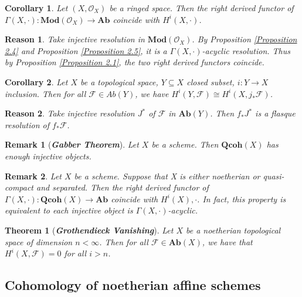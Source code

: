 \documentclass{ctexart}
\newtheorem{remark}{Remark}[section]
\newtheorem{theorem}{Theorem}[section]
\newtheorem{reason}{Reason}[section]
\newtheorem{corollary}{Corollary}[section]
\newcommand{\abeliangroups}{\mathbf{Ab}}
\newcommand{\module}{\mathbf{Mod}}
\newcommand{\quasicoherent}{\mathbf{Qcoh}}
\begin{document}
\begin{corollary}
    Let $(X, \mathcal{O}_{X})$ be a ringed space.
    Then the right derived functor of $\Gamma(X, \cdot): \module (\mathcal{O}_{X}) \longrightarrow \abeliangroups$ coincide with $H^{i}(X, \cdot)$.
    \label{Corollary 2.2}
\end{corollary}
\begin{reason}
    Take injective resolution in $\module (\mathcal{O}_{X})$.
    By Proposition \ref{Proposition 2.4} and Proposition \ref{Proposition 2.5}, it is a $\Gamma(X, \cdot)$-acyclic resolution.
    Thus by Proposition \ref{Proposition 2.1}, the two right derived functors coincide.
\end{reason}
\begin{corollary}
    Let $X$ be a topological space, $Y \subseteq X$ closed subset, $i: Y \longrightarrow X$ inclusion.
    Then for all $\mathcal{F}\in Ab(Y)$, we have $H^{i}(Y, \mathcal{F}) \cong H^{i}(X, j_{\ast}\mathcal{F})$.
    \label{Corollary 2.3}
\end{corollary}
\begin{reason}
    Take injective resolution $J^{\ast}$ of $\mathcal{F}$ in $\abeliangroups (Y)$.
    Then $f_{\ast}J^{\ast}$ is a flasque resolution of $f_{\ast}\mathcal{F}$.
\end{reason}
\begin{remark}[\textbf{\emph{Gabber Theorem}}]
    Let $X$ be a scheme.
    Then $\quasicoherent (X)$ has enough injective objects.
\end{remark}
\begin{remark}
    Let $X$ be a scheme.
    Suppose that X is either noetherian or quasi-compact and separated.
    Then the right derived functor of $\Gamma(X, \cdot): \quasicoherent (X) \longrightarrow \abeliangroups$ coincide with $H^{i}(X), \cdot$.
    In fact, this property is equivalent to each injective object is $\Gamma(X, \cdot)$-acyclic.
\end{remark}
\begin{theorem}[\textbf{\emph{Grothendieck Vanishing}}]
    Let $X$ be a noetherian topological space of dimension $n < \infty$.
    Then for all $\mathcal{F}\in \abeliangroups (X)$, we have that $H^{i}(X, \mathcal{F}) = 0$ for all $i > n$.
    \label{Theorem 2.1}
\end{theorem}

\subsection{Cohomology of noetherian affine schemes}
\label{subsection:Sheaf_Cohomology_Cohomology_of_noetherian_affine_schemes}
\end{document}
